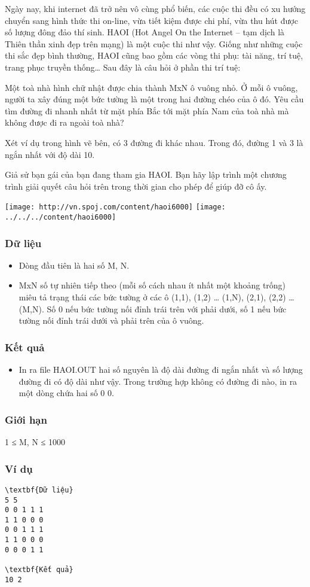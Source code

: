 

Ngày nay, khi internet đã trở nên vô cùng phổ biến, các cuộc thi đều có xu hướng chuyển sang hình thức thi on-line, vừa tiết kiệm được chi phí, vừa thu hút được số lượng đông đảo thí sinh. HAOI (Hot Angel On the Internet – tạm dịch là Thiên thần xinh đẹp trên mạng) là một cuộc thi như vậy. Giống như những cuộc thi sắc đẹp bình thường, HAOI cũng bao gồm các vòng thi phụ: tài năng, trí tuệ, trang phục truyền thống… Sau đây là câu hỏi ở phần thi trí tuệ:

Một toà nhà hình chữ nhật được chia thành MxN ô vuông nhỏ. Ở mỗi ô vuông, người ta xây đúng một bức tường là một trong hai đường chéo của ô đó. Yêu cầu tìm đường đi nhanh nhất từ mặt phía Bắc tới mặt phía Nam của toà nhà mà không được đi ra ngoài toà nhà?

Xét ví dụ trong hình vẽ bên, có 3 đường đi khác nhau. Trong đó, đường 1 và 3 là ngắn nhất với độ dài 10.

Giả sử bạn gái của bạn đang tham gia HAOI. Bạn hãy lập trình một chương trình giải quyết câu hỏi trên trong thời gian cho phép để giúp đỡ cô ấy.


\texttt{[image: http://vn.spoj.com/content/haoi6000]}
\texttt{[image: ../../../content/haoi6000]}

\subsubsection{Dữ liệu}
\begin{itemize}
	\item Dòng đầu tiên là hai số M, N.
	\item MxN số tự nhiên tiếp theo (mỗi số cách nhau ít nhất một khoảng trống) miêu tả trạng thái các bức tường ở các ô (1,1), (1,2) … (1,N), (2,1), (2,2) … (M,N). Số 0 nếu bức tường nối đỉnh trái trên với phải dưới, số 1 nếu bức tường nối đỉnh trái dưới và phải trên của ô vuông.
\end{itemize}

\subsubsection{Kết quả}
\begin{itemize}
	\item In ra file HAOI.OUT hai số nguyên là độ dài đường đi ngắn nhất và số lượng đường đi có độ dài như vậy. Trong trường hợp không có đường đi nào, in ra một dòng chứa hai số 0 0.
\end{itemize}

\subsubsection{Giới hạn}

1 ≤ M, N ≤ 1000

\subsubsection{Ví dụ}
\begin{verbatim}
\textbf{Dữ liệu}
5 5
0 0 1 1 1 
1 1 0 0 0
0 0 1 1 1
1 1 0 0 0
0 0 0 1 1	

\textbf{Kết quả}
10 2
\end{verbatim}